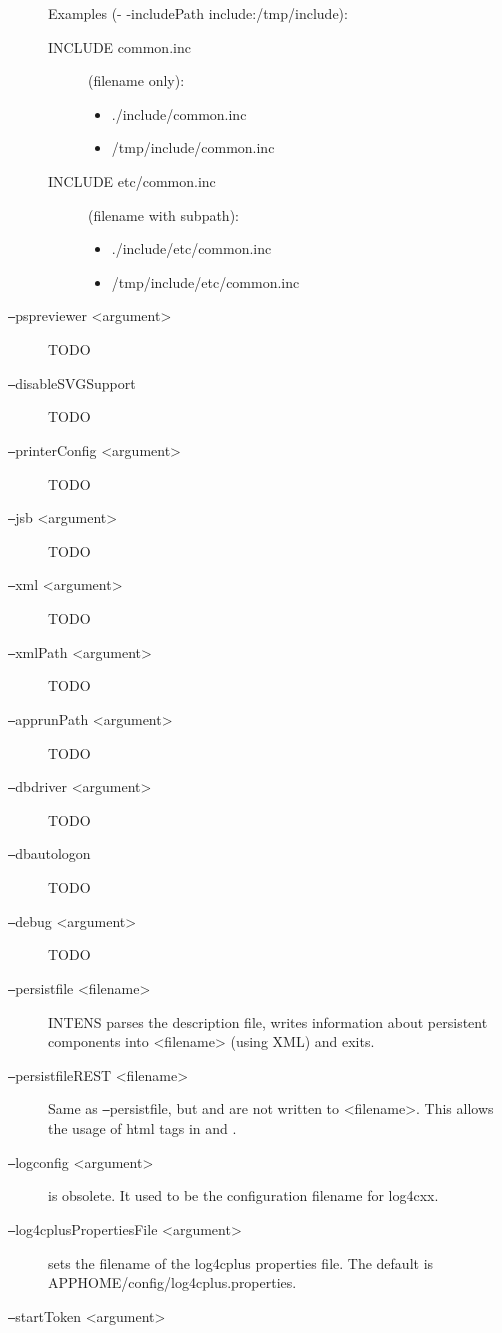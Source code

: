 \begin{description}
  Examples (- -includePath include:/tmp/include): \\
  \begin{description}
  \item[INCLUDE common.inc] (filename only):
  \begin{itemize}
  \item ./include/common.inc
  \item /tmp/include/common.inc
  \end{itemize}
  \item[INCLUDE etc/common.inc] (filename with subpath):
  \begin{itemize}
  \item ./include/etc/common.inc
  \item /tmp/include/etc/common.inc
  \end{itemize}
  \end{description}
%
\item[\texttt{--}pspreviewer <argument>]
  TODO
%
\item[\texttt{--}disableSVGSupport]
  TODO
%
\item[\texttt{--}printerConfig <argument>]
  TODO
%
\item[\texttt{--}jsb <argument>]
  TODO
%
\item[\texttt{--}xml <argument>]
  TODO
%
\item[\texttt{--}xmlPath <argument>]
  TODO
%
\item[\texttt{--}apprunPath <argument>]
  TODO
%
\item[\texttt{--}dbdriver <argument>]
  TODO
%
\item[\texttt{--}dbautologon]
  TODO
%
\item[\texttt{--}debug <argument>]
  TODO
%
\item[\texttt{--}persistfile <filename>]
  INTENS parses the description file, writes information about persistent components
  into <filename> (using XML) and exits.
%
\item[\texttt{--}persistfileREST <filename>]
  Same as \texttt{--}persistfile, but \LABEL{} and \HELPTEXT{} are not written
  to <filename>. This allows the usage of html tags in \LABEL{} and \HELPTEXT{}.
%
\item[\texttt{--}logconfig <argument>] is obsolete.
  It used to be the configuration filename for log4cxx.
%
\item[\texttt{--}log4cplusPropertiesFile <argument>] sets the filename of the log4cplus properties file.
  The default is APPHOME/config/log4cplus.properties.
%
\item[\texttt{--}startToken <argument>]

\end{description}
